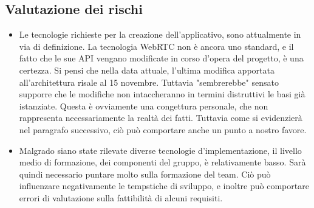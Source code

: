 \subsection{Valutazione dei rischi}
\begin{itemize}
	\item Le tecnologie richieste per la creazione dell'applicativo, sono attualmente in via di definizione. La tecnologia WebRTC non è ancora uno standard, e il fatto che le sue API vengano modificate in corso d'opera del progetto, è una certezza. Si pensi che nella data attuale, l'ultima modifica apportata all'architettura risale al 15 novembre. Tuttavia "sembrerebbe" sensato supporre che le modifiche non intaccheranno in termini distruttivi le basi già istanziate. Questa è ovviamente una congettura personale, che non rappresenta necessariamente la realtà dei fatti. Tuttavia come  si evidenzierà nel paragrafo successivo, ciò può comportare anche un punto a nostro favore.
	\item Malgrado siano state rilevate diverse tecnologie d'implementazione, il livello medio di formazione, dei componenti del gruppo, è relativamente basso. Sarà quindi necessario puntare molto sulla formazione del team. Ciò può influenzare negativamente le tempstiche di sviluppo, e inoltre può comportare errori di valutazione sulla fattibilità di alcuni requisiti.
\end{itemize}

